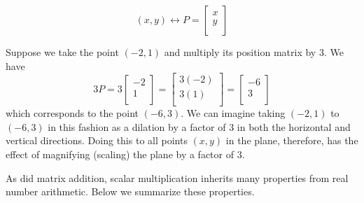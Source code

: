 \[ (x,y) \leftrightarrow P = \left[ \begin{array}{r} x \\ y \\ \end{array} \right] \]
 
Suppose we take the point $(-2,1)$ and multiply its position matrix by $3$.  We have\[ 3P = 3 \left[ \begin{array}{r} -2 \\ 1 \\ \end{array} \right] = \left[ \begin{array}{r} 3(-2) \\ 3(1) \\ \end{array} \right] = \left[ \begin{array}{r} -6 \\ 3 \\ \end{array} \right]\] which corresponds to the point $(-6,3)$. We can imagine taking $(-2,1)$ to $(-6,3)$ in this fashion as a dilation by a factor of $3$ in both the horizontal and vertical directions.  Doing this to all points $(x,y)$ in the plane, therefore, has the effect of magnifying (scaling) the plane by a factor of $3$.  

\newpage

As did matrix addition, scalar multiplication inherits many properties from real number arithmetic.  Below we summarize these properties.

